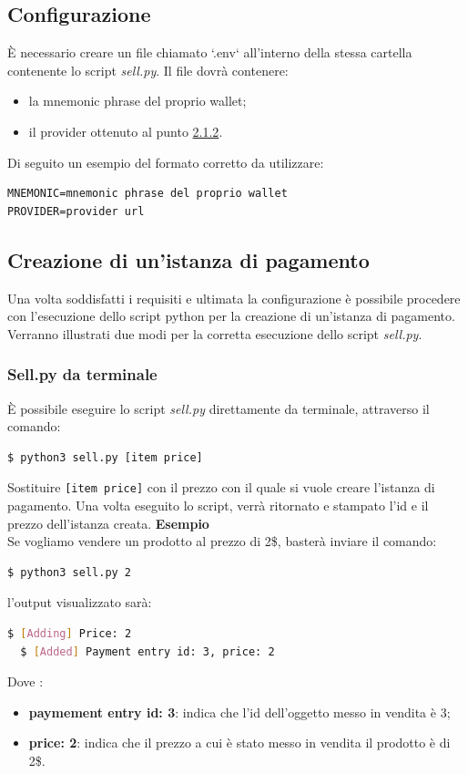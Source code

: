 \documentclass[a4paper, 12pt]{article}
\begin{document}
\subsection{Configurazione}
È necessario creare un file chiamato `.env` all'interno della stessa cartella contenente lo script \textit{sell.py}. Il file dovrà contenere:
\begin{itemize}
  \item la mnemonic phrase del proprio wallet;
  \item il provider ottenuto al punto \hyperref[sec:provider]{2.1.2}.
\end{itemize}
Di seguito un esempio del formato corretto da utilizzare:
\begin{verbatim}
MNEMONIC=mnemonic phrase del proprio wallet
PROVIDER=provider url
\end{verbatim}
\subsection{Creazione di un'istanza di pagamento}
Una volta soddisfatti i requisiti e ultimata la configurazione è possibile procedere con l'esecuzione dello script python per la creazione di un'istanza di pagamento. Verranno illustrati due modi per la corretta esecuzione dello script \textit{sell.py}.
\subsubsection{Sell.py da terminale}
È possibile eseguire lo script \textit{sell.py} direttamente da terminale, attraverso il comando:
\begin{lstlisting}[language=bash]
  $ python3 sell.py [item price]
\end{lstlisting}
Sostituire \verb|[item price]| con il prezzo con il quale si vuole creare l'istanza di pagamento.
Una volta eseguito lo script, verrà ritornato e stampato l'id e il prezzo dell'istanza creata.
\textbf{Esempio}
\\
Se vogliamo vendere un prodotto al prezzo di 2\$, basterà inviare il comando:
\begin{lstlisting}[language=bash]
  $ python3 sell.py 2
\end{lstlisting}
l'output visualizzato sarà:
\begin{lstlisting}[language=bash]
  $ [Adding] Price: 2
  $ [Added] Payment entry id: 3, price: 2
\end{lstlisting}
Dove :
\begin{itemize}
  \item \textbf{paymement entry id: 3}: indica che l'id dell'oggetto messo in vendita è 3;
  \item \textbf{price: 2}: indica che il prezzo a cui è stato messo in vendita il prodotto è di 2\$.
\end{itemize}
\end{document}
